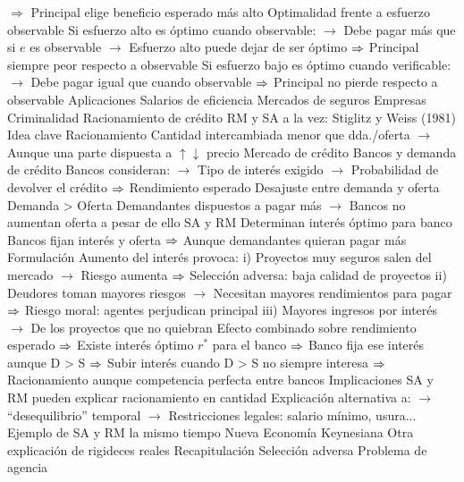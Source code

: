 \documentclass{nuevotema}
\begin{document}
\begin{esquemal}
				\4[] $\Rightarrow$ Principal elige beneficio esperado más alto
				\4 Optimalidad frente a esfuerzo observable
				\4[] Si esfuerzo alto es óptimo cuando observable:
				\4[] $\to$ Debe pagar más que si $e$ es observable
				\4[] $\to$ Esfuerzo alto puede dejar de ser óptimo
				\4[] $\Rightarrow$ Principal siempre peor respecto a observable
				\4[] Si esfuerzo bajo es óptimo cuando verificable:
				\4[] $\to$ Debe pagar igual que cuando observable
				\4[] $\Rightarrow$ Principal no pierde respecto a observable
		\2 Aplicaciones
			\3 Salarios de eficiencia
			\3 Mercados de seguros
			\3 Empresas
			\3 Criminalidad
			\3 Racionamiento de crédito
		\2 RM y SA a la vez: Stiglitz y Weiss (1981)
			\3 Idea clave
				\4 Racionamiento
				\4[] Cantidad intercambiada menor que dda./oferta
				\4[] $\to$ Aunque una parte dispuesta a $\uparrow \downarrow$ precio
				\4 Mercado de crédito
				\4[] Bancos y demanda de crédito
				\4[] Bancos consideran:
				\4[] $\to$ Tipo de interés exigido
				\4[] $\to$ Probabilidad de devolver el crédito
				\4[] $\Rightarrow$ Rendimiento esperado
				\4 Desajuste entre demanda y oferta
				\4[] Demanda > Oferta
				\4[] Demandantes dispuestos a pagar más
				\4[] $\to$ Bancos no aumentan oferta a pesar de ello
				\4 SA y RM
				\4[] Determinan interés óptimo para banco
				\4[] Bancos fijan interés y oferta
				\4[] $\Rightarrow$ Aunque demandantes quieran pagar más
			\3 Formulación
				\4 Aumento del interés provoca:
				\4[] i) Proyectos muy seguros salen del mercado
				\4[] $\to$ Riesgo aumenta
				\4[] $\Rightarrow$ Selección adversa: baja calidad de proyectos
				\4[] ii) Deudores toman mayores riesgos
				\4[] $\to$ Necesitan mayores rendimientos para pagar
				\4[] $\Rightarrow$ Riesgo moral: agentes perjudican principal
				\4[] iii) Mayores ingresos por interés
				\4[] $\to$ De los proyectos que no quiebran
				\4[] Efecto combinado sobre rendimiento esperado
				\4[] $\Rightarrow$ Existe interés óptimo $r^*$ para el banco
				\4[] $\Rightarrow$ Banco fija ese interés aunque D > S
				\4[] $\Rightarrow$ Subir interés cuando D > S no siempre interesa
				\4[] $\Rightarrow$ Racionamiento aunque competencia perfecta entre bancos
				\4[] 
			\3 Implicaciones
				\4 SA y RM pueden explicar racionamiento en cantidad
				\4[] Explicación alternativa a:
				\4[] $\to$ ``desequilibrio'' temporal
				\4[] $\to$ Restricciones legales: salario mínimo, usura...
				\4 Ejemplo de SA y RM la mismo tiempo
				\4 Nueva Economía Keynesiana
				\4[] Otra explicación de rigideces reales
	\1[] 
		\2 Recapitulación
			\3 Selección adversa
			\3 Problema de agencia

\end{esquemal}
\end{document}
